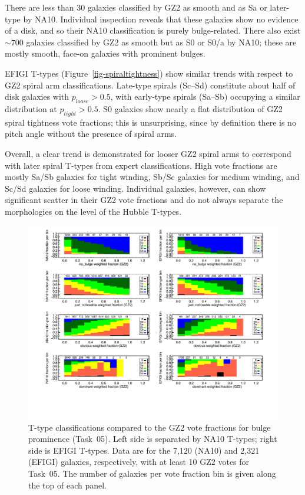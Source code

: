 \documentclass[useAMS,usenatbib]{mn2e}
\providecommand{\DIFaddtex}[1]{{\protect\color{blue}\uwave{#1}}} %
\providecommand{\DIFdeltex}[1]{{\protect\color{red}\sout{#1}}}                      %
\providecommand{\DIFaddbegin}{} %
\providecommand{\DIFaddend}{} %
\providecommand{\DIFdelbegin}{} %
\providecommand{\DIFdelend}{} %
\providecommand{\DIFadd}[1]{\texorpdfstring{\DIFaddtex{#1}}{#1}} %
\providecommand{\DIFdel}[1]{\texorpdfstring{\DIFdeltex{#1}}{}} %
\begin{document}
There are less than 30 galaxies classified by GZ2 as smooth and as Sa or later-type by NA10. Individual inspection reveals that these galaxies show no evidence of a disk, and so their NA10 classification is purely bulge-related. There also exist $\sim700$ galaxies classified by GZ2 as smooth but as S0 or S0/a by NA10; these are mostly smooth, face-on galaxies with prominent bulges. 

EFIGI T-types (Figure~\ref{fig-spiraltightness}) show similar trends with respect to GZ2 spiral arm classifications. Late-type spirals (Sc--Sd) constitute about half of disk galaxies with \DIFdelbegin \DIFdel{$p_{loose}>0.5$}\DIFdelend \DIFaddbegin \DIFadd{$p_\mathrm{loose}>0.5$}\DIFaddend , with early-type spirals (Sa--Sb) occupying a similar distribution at \DIFdelbegin \DIFdel{$p_{tight}>0.5$}\DIFdelend \DIFaddbegin \DIFadd{$p_\mathrm{tight}>0.5$}\DIFaddend . S0 galaxies show nearly a flat distribution of GZ2 spiral tightness vote fractions; this is unsurprising, since by definition there is no pitch angle without the presence of spiral arms.

Overall, a clear trend is demonstrated for looser GZ2 spiral arms to correspond with later spiral T-types from expert classifications. High vote fractions are mostly Sa/Sb galaxies for tight winding, Sb/Sc galaxies for medium winding, and Sc/Sd galaxies for loose winding. Individual galaxies, however, can show significant scatter in their GZ2 vote fractions and do not always separate the morphologies on the level of the Hubble T-types. 

\begin{figure}
\includegraphics[angle=0,width=7.0in]{figures/bulgeprominence_color.pdf}
\caption{T-type classifications compared to the GZ2 vote fractions for bulge prominence (Task~05). Left side is separated by NA10 T-types; right side is EFIGI T-types. Data are for the 7,120 (NA10) and 2,321 (EFIGI) galaxies, respectively, with at least 10 GZ2 votes for Task~05. The number of galaxies per vote fraction bin is given along the top of each panel. 
\label{fig-bulgeprominence}}
\end{figure}
\end{document}
